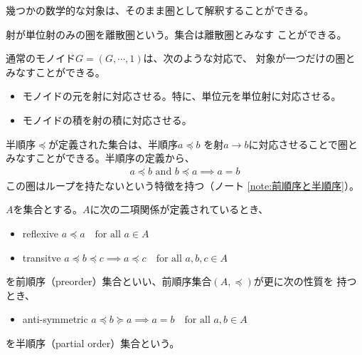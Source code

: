 {	幾つかの数学的な対象は、そのまま圏として解釈することができる。
	\begin{description}\setlength{\itemsep}{-1mm} %
		\item[離散圏] 射が単位射のみの圏を離散圏という。集合は離散圏とみなす
		ことができる。
		\item[モノイド] 通常のモノイド$G=(G,\cdots,1)$は、次のような対応で、
		対象が一つだけの圏とみなすことができる。
		\begin{itemize}\setlength{\itemsep}{-1mm} %
			\item モノイドの元を射に対応させる。特に、単位元を単位射に対応させる。
			\item モノイドの積を射の積に対応させる。
		\end{itemize} %
		\item[半順序集合] 半順序$\preceq$が定義された集合は、半順序$a\preceq b$
		を射$a\to b$に対応させることで圏とみなすことができる。半順序の定義から、
		\begin{equation*}\begin{split}
			a\preceq b \text{ and } b\preceq a \implies a = b
		\end{split}\end{equation*}
		この圏はループを持たないという特徴を持つ（ノート
		\ref{note:前順序と半順序}）。
	\end{description} %

	\begin{note}[前順序と半順序]\label{note:前順序と半順序} %
	$A$を集合とする。$A$に次の二項関係が定義されているとき、
	\begin{itemize}\setlength{\itemsep}{-1mm} %
		\item reflexive \quad$a\preceq a \quad\text{for all }a\in A$
		\item transitve \quad$a\preceq b\preceq c\implies a\preceq c 
		\quad\text{for all }a,b,c\in A$
	\end{itemize} %
	を前順序（preorder）集合といい、前順序集合$(A,\preceq)$が更に次の性質を
	持つとき、
	\begin{itemize}\setlength{\itemsep}{-1mm} %
		\item anti-symmetric \quad $a\preceq b\succeq a\implies a=b
		\quad\text{for all }a,b\in A$
	\end{itemize} %
	を半順序（partial order）集合という。
	\end{note} %
}
